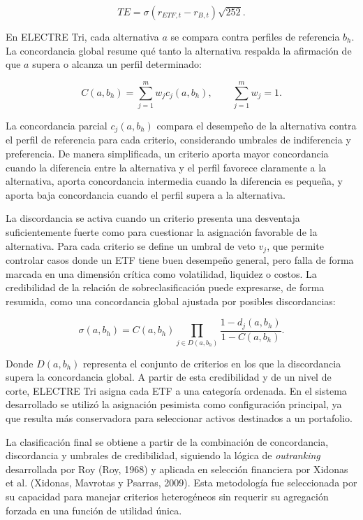\documentclass[12pt,letterpaper]{article}
\begin{document}
\begin{equation}
TE = \sigma(r_{ETF,t} - r_{B,t})\sqrt{252}.
\label{eq:tracking_error}
\end{equation}

En ELECTRE Tri, cada alternativa $a$ se compara contra perfiles de referencia $b_h$. La concordancia global resume qué tanto la alternativa respalda la afirmación de que $a$ supera o alcanza un perfil determinado:

\begin{equation}
C(a,b_h) = \sum_{j=1}^{m} w_j c_j(a,b_h), \qquad \sum_{j=1}^{m} w_j = 1.
\label{eq:concordancia}
\end{equation}

La concordancia parcial $c_j(a,b_h)$ compara el desempeño de la alternativa contra el perfil de referencia para cada criterio, considerando umbrales de indiferencia y preferencia. De manera simplificada, un criterio aporta mayor concordancia cuando la diferencia entre la alternativa y el perfil favorece claramente a la alternativa, aporta concordancia intermedia cuando la diferencia es pequeña, y aporta baja concordancia cuando el perfil supera a la alternativa.

La discordancia se activa cuando un criterio presenta una desventaja suficientemente fuerte como para cuestionar la asignación favorable de la alternativa. Para cada criterio se define un umbral de veto $v_j$, que permite controlar casos donde un ETF tiene buen desempeño general, pero falla de forma marcada en una dimensión crítica como volatilidad, liquidez o costos. La credibilidad de la relación de sobreclasificación puede expresarse, de forma resumida, como una concordancia global ajustada por posibles discordancias:

\begin{equation}
\sigma(a,b_h) = C(a,b_h) \prod_{j \in D(a,b_h)} \frac{1-d_j(a,b_h)}{1-C(a,b_h)}.
\label{eq:credibilidad}
\end{equation}

Donde $D(a,b_h)$ representa el conjunto de criterios en los que la discordancia supera la concordancia global. A partir de esta credibilidad y de un nivel de corte, ELECTRE Tri asigna cada ETF a una categoría ordenada. En el sistema desarrollado se utilizó la asignación pesimista como configuración principal, ya que resulta más conservadora para seleccionar activos destinados a un portafolio.

La clasificación final se obtiene a partir de la combinación de concordancia, discordancia y umbrales de credibilidad, siguiendo la lógica de \textit{outranking} desarrollada por Roy (Roy, 1968) y aplicada en selección financiera por Xidonas et al. (Xidonas, Mavrotas y Psarras, 2009). Esta metodología fue seleccionada por su capacidad para manejar criterios heterogéneos sin requerir su agregación forzada en una función de utilidad única.
\end{document}
